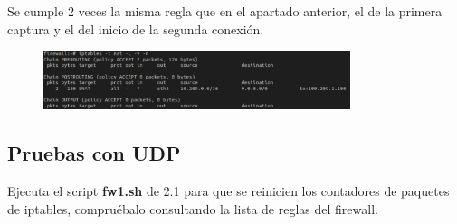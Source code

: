 \documentclass[12pt, a4paper]{report}
\begin{document}
\begin{enumerate}
	Se cumple 2 veces la misma regla que en el apartado anterior, el de la primera captura y el del inicio de la segunda conexión.\\
	\begin{figure}[h]
		\centering
		\includegraphics[width=0.8\textwidth]{ej2.1.1_6}
	\end{figure}
\end{enumerate}
\subsection{Pruebas con UDP}
Ejecuta el script \textbf{fw1.sh} de 2.1 para que se reinicien los contadores de paquetes de iptables, compruébalo consultando la lista de reglas del firewall.
\end{document}
